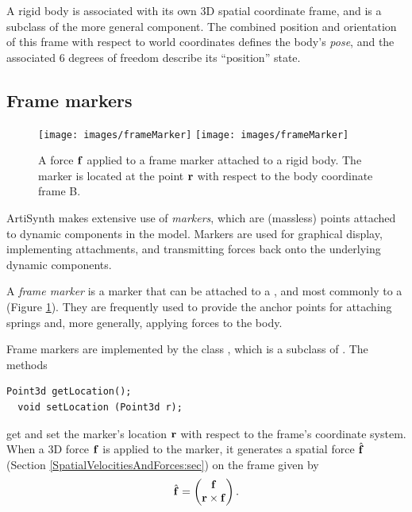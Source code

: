 A rigid body is associated with its own 3D spatial coordinate frame,
and is a subclass of the more general
 component.
The combined position and orientation of this frame with respect to
world coordinates defines the body's {\it pose}, and the associated 6
degrees of freedom describe its ``position'' state.

\subsection{Frame markers}
\label{FrameMarkers:sec}

\begin{figure}[t]
\begin{center}
 \iflatexml
   \texttt{[image: images/frameMarker]}
 \else
   \texttt{[image: images/frameMarker]}
 \fi
\end{center}
\caption{A force ${\bf f}$ applied to a frame marker attached to a rigid
body. The marker is located at the point ${\bf r}$ with respect to the body
coordinate frame B.}
\label{frameMarker:fig}
\end{figure}

ArtiSynth makes extensive use of {\it markers}, which are (massless)
points attached to dynamic components in the model. Markers are used
for graphical display, implementing attachments, and transmitting
forces back onto the underlying dynamic components.

A {\it frame marker} is a marker that can be attached to a
, and most commonly to a
 (Figure
\ref{frameMarker:fig}). They are frequently used to provide the
anchor points for attaching springs and, more generally, applying
forces to the body.

Frame markers are implemented by the class
, which
is a subclass of
.
The methods
%
\begin{lstlisting}[]
  Point3d getLocation();
  void setLocation (Point3d r);
\end{lstlisting}
%
get and set the marker's location ${\bf r}$ with respect to the frame's
coordinate system. When a 3D force ${\bf f}$ is applied to the marker, it
generates a spatial force $\hat{{\bf f}}$ (Section
\ref{SpatialVelocitiesAndForces:sec}) on the frame given by
%
\begin{equation}
\hat{{\bf f}} = \left(\begin{matrix} {\bf f} \\ {\bf r} \times {\bf f} \end{matrix}\right).
\end{equation}
%

